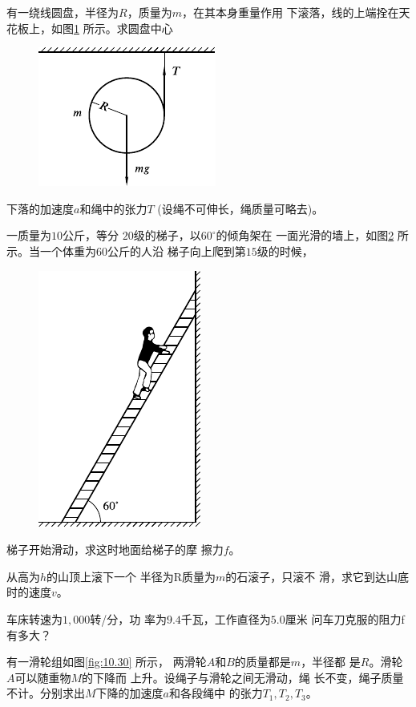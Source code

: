 \begin{exercises}
\exercise 有一绕线圆盘，半径为$ R $，质量为$ m $，在其本身重量作用
下滚落，线的上端拴在天花板上，如图\ref{fig:10.28} 所示。求圆盘中心
\begin{figure}
  \centering
  \includegraphics{figure/fig10.28}
  \caption{}
  \label{fig:10.28}
\end{figure}
下落的加速度$ a $和绳中的张力$ T $
(设绳不可伸长，绳质量可略去)。

\exercise 一质量为$ 10 $公斤，等分
$ 20 $级的梯子，以$ 60^\circ $的倾角架在
一面光滑的墙上，如图\ref{fig:10.29} 所
示。当一个体重为$ 60 $公斤的人沿
梯子向上爬到第$ 15 $级的时候，

\clearpage\noindent
\begin{figure}
  \centering
  \includegraphics{figure/fig10.29}
  \caption{}
  \label{fig:10.29}
\end{figure}
梯子开始滑动，求这时地面给梯子的摩
擦力$ f $。

\exercise 从高为$ h $的山顶上滚下一个
半径为R质量为$ m $的石滚子，只滚不
滑，求它到达山底时的速度$ v $。

\exercise 车床转速为$ 1,000 $转/分，功
率为$ 9.4 $千瓦，工作直径为$ 5.0 $厘米
问车刀克服的阻力f有多大？

\exercise 有一滑轮组如图\ref{fig:10.30} 所示，
两滑轮$ A $和$ B $的质量都是$ m $，半径都
是$ R $。滑轮$ A $可以随重物$ M $的下降而
上升。设绳子与滑轮之间无滑动，绳
长不变，绳子质量不计。分别求出$ M $下降的加速度$ a $和各段绳中
的张力$ T _ { 1 } , T _ { 2 } , T _ { 3 } $。


\end{exercises}
